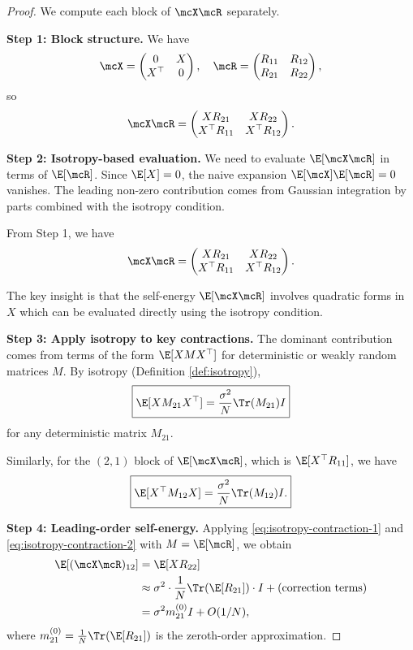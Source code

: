 \begin{proof}
We compute each block of $\mcX \mcR$ separately.

\textbf{Step 1: Block structure.} We have
\[
\mcX = \begin{pmatrix} 0 & X \\ X^\top & 0 \end{pmatrix}, \quad
\mcR = \begin{pmatrix} R_{11} & R_{12} \\ R_{21} & R_{22} \end{pmatrix},
\]
so
\[
\mcX \mcR = \begin{pmatrix} X R_{21} & X R_{22} \\ X^\top R_{11} & X^\top R_{12} \end{pmatrix}.
\]

\textbf{Step 2: Isotropy-based evaluation.} We need to evaluate $\E[\mcX \mcR]$ in terms of $\E[\mcR]$. Since $\E[X] = 0$, the naive expansion $\E[\mcX]\E[\mcR] = 0$ vanishes. The leading non-zero contribution comes from Gaussian integration by parts combined with the isotropy condition.

From Step 1, we have
\[
\mcX \mcR = \begin{pmatrix} X R_{21} & X R_{22} \\ X^\top R_{11} & X^\top R_{12} \end{pmatrix}.
\]

The key insight is that the self-energy $\E[\mcX \mcR]$ involves quadratic forms in $X$ which can be evaluated directly using the isotropy condition.

\textbf{Step 3: Apply isotropy to key contractions.} The dominant contribution comes from terms of the form $\E[X M X^\top]$ for deterministic or weakly random matrices $M$. By isotropy (Definition \ref{def:isotropy}),
\begin{equation}\label{eq:isotropy-contraction-1}
\boxed{\E[X M_{21} X^\top] = \frac{\sigma^2}{N}\Tr(M_{21}) I}
\end{equation}
for any deterministic matrix $M_{21}$.

Similarly, for the $(2,1)$ block of $\E[\mcX \mcR]$, which is $\E[X^\top R_{11}]$, we have
\begin{equation}\label{eq:isotropy-contraction-2}
\boxed{\E[X^\top M_{12} X] = \frac{\sigma^2}{N}\Tr(M_{12}) I.}
\end{equation}

\textbf{Step 4: Leading-order self-energy.} Applying \eqref{eq:isotropy-contraction-1} and \eqref{eq:isotropy-contraction-2} with $M = \E[\mcR]$, we obtain
\begin{align}
\E[(\mcX \mcR)_{12}] &= \E[X R_{22}] \\
&\approx \sigma^2 \cdot \frac{1}{N}\Tr(\E[R_{21}]) \cdot I + \text{(correction terms)} \\
&= \sigma^2 m_{21}^{(0)} I + O(1/N),
\end{align}
where $m_{21}^{(0)} = \frac{1}{N}\Tr(\E[R_{21}])$ is the zeroth-order approximation.


\end{proof}
